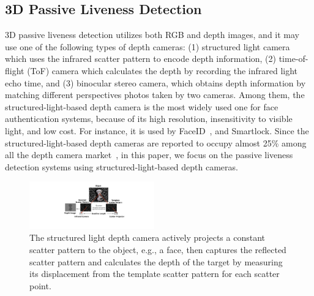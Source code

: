 \subsection{3D Passive Liveness Detection}

3D passive liveness detection utilizes both RGB and depth images, and it may use one of the following types of depth cameras: (1) structured light camera which uses the infrared scatter pattern to encode depth information, (2) time-of-flight (ToF) camera which calculates the depth by recording the infrared light echo time, and (3) binocular stereo camera, which obtains depth information by matching different perspectives photos taken by two cameras.
Among them, the structured-light-based depth camera is the most widely used one for face authentication systems, because of its high resolution, insensitivity to visible light, and low cost. For instance, it is used by FaceID~\cite{han2007face,bud2018facing}, and Smartlock\cite{waseem2020face}. Since the structured-light-based depth cameras are reported to occupy  almost 25\% among all the depth camera market~\cite{3dcameramarket},
in this paper, we focus on the passive liveness detection systems using structured-light-based depth cameras. 

\begin{figure}[pt] 
	\centerline{\includegraphics[width = 0.48\textwidth]{figures/structured_light_camera.pdf}}
	\vspace{-0.1in}
	\caption{The structured light depth camera actively projects a constant scatter pattern to the object, e.g., a face, then captures the reflected scatter pattern and calculates the depth of the target by measuring its displacement from the template scatter pattern for each scatter point. }
	\label{depth_camera}
	\vspace{-0.15in}
\end{figure}


